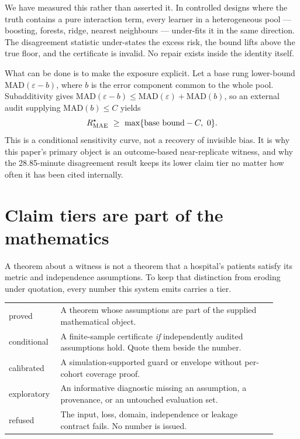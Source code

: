 \documentclass[11pt,a4paper]{article}
\newcommand{\risk}{R^{\star}}
\newcommand{\tier}[1]{\textsf{\small#1}}
\begin{document}
We have measured this rather than asserted it. In controlled designs where the truth contains a pure interaction term, every learner in a heterogeneous pool --- boosting, forests, ridge, nearest neighbours --- under-fits it in the same direction. The disagreement statistic under-states the excess risk, the bound lifts above the true floor, and the certificate is invalid. No repair exists inside the identity itself.

What can be done is to make the exposure explicit. Let a base rung lower-bound $\mathrm{MAD}(\varepsilon-b)$, where $b$ is the error component common to the whole pool. Subadditivity gives $\mathrm{MAD}(\varepsilon-b)\leq\mathrm{MAD}(\varepsilon)+\mathrm{MAD}(b)$, so an external audit supplying $\mathrm{MAD}(b)\leq C$ yields
\[
\risk_{\rm MAE}\ \geq\ \max\{\text{base bound}-C,\ 0\}.
\]
This is a conditional sensitivity curve, not a recovery of invisible bias. It is why this paper's primary object is an outcome-based near-replicate witness, and why the 28.85-minute disagreement result keeps its lower claim tier no matter how often it has been cited internally.

\section{Claim tiers are part of the mathematics}

A theorem about a witness is not a theorem that a hospital's patients satisfy its metric and independence assumptions. To keep that distinction from eroding under quotation, every number this system emits carries a tier.

\begin{center}
\small
\begin{tabular}{p{0.15\linewidth}p{0.76\linewidth}}
\toprule
\tier{proved} & A theorem whose assumptions are part of the supplied mathematical object. \\
\tier{conditional} & A finite-sample certificate \emph{if} independently audited assumptions hold. Quote them beside the number. \\
\tier{calibrated} & A simulation-supported guard or envelope without per-cohort coverage proof. \\
\tier{exploratory} & An informative diagnostic missing an assumption, a provenance, or an untouched evaluation set. \\
\tier{refused} & The input, loss, domain, independence or leakage contract fails. No number is issued. \\
\bottomrule
\end{tabular}
\normalsize
\end{center}
\end{document}
